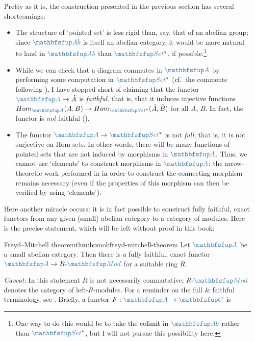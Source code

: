 Pretty as it is, the construction presented in the previous section
has several shortcomings:
\begin{itemize}
\item The structure of `pointed set' is less rigid than, say, that of
  an abelian group; since $\categ{Ab}$ is itself an abelian category,
  it would be more natural to land in $\categ{Ab}$ than
  $\categ{Set}^*$, if possible.\footnote{One way to do this would be
    to take the colimit in $\categ{Ab}$ rather than $\categ{Set}^*$,
    but I will not pursue this possibility here.}
\item While we can check that a diagram commutes in $\categ{A}$ by
  performing some computation in $\categ{Set}^*$ (cf.\ the comments
  following ), I have stopped short of claiming
  that the functor $\categ{A} \to \hat{A}$ is \emph{faithful}, that
  is, that it induces injective functions
  $\Hom_{\categ{A}}(A,B) \to \Hom_{\categ{Set}^*}(\hat{A},\hat{B})$
  for all $A$, $B$. In fact, the functor is \emph{not} faithful
  ().
\item The functor $\categ{A} \to \categ{Set}^*$ is not \emph{full};
  that is, it is not surjective on Hom-sets. In other words, there
  will be many functions of pointed sets that are not induced by
  morphisms in $\categ{A}$. Thus, we cannot use `elements' to
  construct morphisms in $\categ{A}$: the arrow-theoretic work
  performed in  in order
  to construct the connecting morphism remains necessary (even if the
  properties of this morphism can then be verified by using
  `elements').
\end{itemize}
Here another miracle occurs: it is in fact possible to construct fully
faithful, exact functors from any given (small) abelian category to a
category of modules. Here is the precise statement, which will be left
without proof in this book:
\begin{thm}{Freyd--Mitchell theorem}{thm:homol:freyd-mitchell-theorem}
  Let $\categ{A}$ be a small abelian category. Then there is a fully
  faithful, exact functor $\categ{A} \to R\text{-}\categ{Mod}$ for a
  suitable ring $R$.
\end{thm}
\emph{Caveat:} In this statement $R$ is not necessarily commutative;
$R\text{-}\categ{Mod}$ denotes the category of left-$R$-modules.  For
a reminder on the full \& faithful terminology, see
. Briefly, a functor $F : \categ{A} \to \categ{C}$ is

